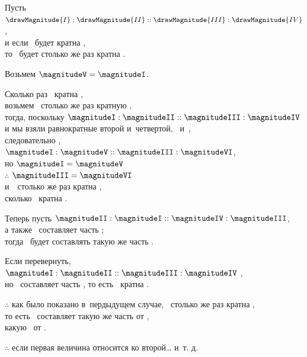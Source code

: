 \documentclass[letters,booklanguage=russian]{byrnebook}
\begin{document}
\begin{center}
Пусть $\drawMagnitude{I} : \drawMagnitude{II} :: \drawMagnitude{III} : \drawMagnitude{IV}$,\\
и если \magnitudeI\ будет кратна \magnitudeII,\\
то \magnitudeIII\ будет столько же раз кратна \magnitudeIV.

Возьмем  $\magnitudeV = \magnitudeI$.

Сколько раз \magnitudeI\ кратна \magnitudeII,\\
возьмем \magnitudeVI\ столько же раз кратную \magnitudeIV, \\
тогда, поскольку $\magnitudeI : \magnitudeII :: \magnitudeIII : \magnitudeIV$\\
и мы взяли равнократные второй и~четвертой, \magnitudeI\ и~\magnitudeVI,\\
следовательно ,\\
$\magnitudeI : \magnitudeV :: \magnitudeIII : \magnitudeVI$,\\
 но \byref{\constref} $\magnitudeI = \magnitudeV$\\
 $\therefore$  $\magnitudeIII = \magnitudeVI$\\
 и~\magnitudeVI\ столько же раз кратна \magnitudeIV,\\
 сколько \magnitudeI\ кратна \magnitudeII.

Теперь пусть $\magnitudeII : \magnitudeI :: \magnitudeIV : \magnitudeIII$,\\
а также \magnitudeII\ составляет часть \magnitudeI;\\
тогда \magnitudeIV\ будет составлять такую же часть \magnitudeIII.

Если перевернуть, $\magnitudeI : \magnitudeII :: \magnitudeIII : \magnitudeIV$ ,\\
но \magnitudeII\ составляет часть \magnitudeI,
то есть \magnitudeI\ кратна \magnitudeII.

$\therefore$ как было показано в~пердыдущем случае, \magnitudeIII\ столько же раз кратна \magnitudeIV,\\
то есть \magnitudeIV\ составляет такую же часть от \magnitudeIII,\\
какую \magnitudeII\ от \magnitudeI.

$\therefore$ если первая величина относится ко второй… и~т. д.
\end{center}

\vfill\pagebreak

\end{document}
